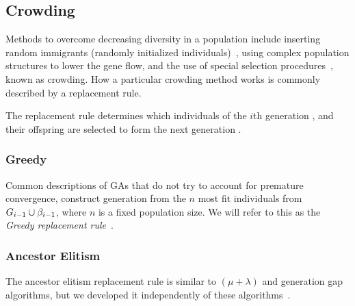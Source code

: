 \subsection{Crowding}\label{sec:replacementrules}
Methods to overcome decreasing diversity in a population include inserting random immigrants (randomly initialized individuals)~\cite{Cobb93geneticalgorithms}, using complex population structures to lower the gene flow, and the use of special selection procedures~\cite{ursem2002diversity, DeJong:1975:ABC:907087}, known as crowding. How a particular crowding method works is commonly described by a replacement rule.

The replacement rule determines which individuals of the $i$th generation , and their offspring  are selected to form the next generation .

\subsubsection{Greedy}
Common descriptions of GAs that do not try to account for premature convergence,
construct generation  from the $n$ most fit individuals from $G_{i-1} \cup \beta_{i-1}$, where $n$ is a fixed population size. We will refer to this as the \emph{Greedy replacement rule}~\cite{masterThesisGANN}.


%

\subsubsection{Ancestor Elitism}
The ancestor elitism replacement rule is similar to $\left(\mu + \lambda\right)$ and generation gap algorithms, but we developed it independently of these algorithms~\cite[p.\ 34, p.\ 50]{Luke2013Metaheuristics}.


